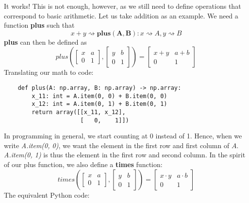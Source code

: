 It works! This is not enough, however, as we still need to define operations
that correspond to basic arithmetic. Let us take addition as an
example. We need a function \textbf{plus} such that
\begin{equation*}
    x + y \rightsquigarrow \mathbf{plus(A, B)} : x \rightsquigarrow A, y
    \rightsquigarrow B
\end{equation*}
\textbf{plus} can then be defined as
\begin{equation*}
    plus\left(
    \begin{bmatrix}
        x & a \\
        0 & 1
    \end{bmatrix},
    \begin{bmatrix}
        y & b \\
        0 & 1
    \end{bmatrix}
    \right)
    =
    \begin{bmatrix}
        x + y & a + b \\
        0     & 1
    \end{bmatrix}
\end{equation*}
Translating our math to code:
\begin{verbatim}
    def plus(A: np.array, B: np.array) -> np.array:
        x_11: int = A.item(0, 0) + B.item(0, 0)
        x_12: int = A.item(0, 1) + B.item(0, 1)
        return array([[x_11, x_12],
                      [   0,    1]])
\end{verbatim}
In programming in general, we start counting at 0 instead of 1. Hence, when we
write \textit{A.item(0, 0)}, we want the element in the first row and first
column
of
$ A $. \textit{A.item(0, 1)} is thus the element in the first row and second
column. In the spirit of our plus function, we also define a \textbf{times}
function:
\begin{equation*}
   times\left(
   \begin{bmatrix}
       x & a \\
       0 & 1
   \end{bmatrix},
   \begin{bmatrix}
       y & b \\
       0 & 1
   \end{bmatrix}
   \right)
   =
   \begin{bmatrix}
       x \cdot y & a  \cdot b \\
       0     & 1
   \end{bmatrix}
\end{equation*}
The equivalent Python code:
